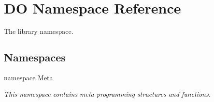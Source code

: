 \hypertarget{namespace_d_o}{\section{D\-O Namespace Reference}
\label{namespace_d_o}
}


The library namespace.  


\subsection*{Namespaces}
\begin{DoxyCompactItemize}
\item 
namespace \hyperlink{namespace_d_o_1_1_meta}{Meta}
\begin{DoxyCompactList}\small\item\em This namespace contains meta-\/programming structures and functions. \end{DoxyCompactList}\end{DoxyCompactItemize}
